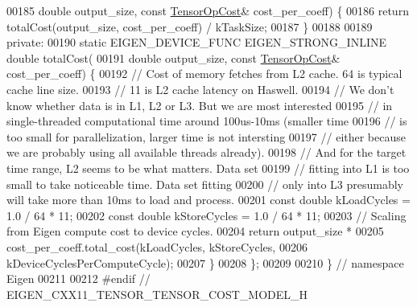 \begin{DoxyCode}
00185       \textcolor{keywordtype}{double} output\_size, \textcolor{keyword}{const} \hyperlink{class_eigen_1_1_tensor_op_cost}{TensorOpCost}& cost\_per\_coeff) \{
00186     \textcolor{keywordflow}{return} totalCost(output\_size, cost\_per\_coeff) / kTaskSize;
00187   \}
00188 
00189  \textcolor{keyword}{private}:
00190   \textcolor{keyword}{static} EIGEN\_DEVICE\_FUNC EIGEN\_STRONG\_INLINE \textcolor{keywordtype}{double} totalCost(
00191       \textcolor{keywordtype}{double} output\_size, \textcolor{keyword}{const} \hyperlink{class_eigen_1_1_tensor_op_cost}{TensorOpCost}& cost\_per\_coeff) \{
00192     \textcolor{comment}{// Cost of memory fetches from L2 cache. 64 is typical cache line size.}
00193     \textcolor{comment}{// 11 is L2 cache latency on Haswell.}
00194     \textcolor{comment}{// We don't know whether data is in L1, L2 or L3. But we are most interested}
00195     \textcolor{comment}{// in single-threaded computational time around 100us-10ms (smaller time}
00196     \textcolor{comment}{// is too small for parallelization, larger time is not intersting}
00197     \textcolor{comment}{// either because we are probably using all available threads already).}
00198     \textcolor{comment}{// And for the target time range, L2 seems to be what matters. Data set}
00199     \textcolor{comment}{// fitting into L1 is too small to take noticeable time. Data set fitting}
00200     \textcolor{comment}{// only into L3 presumably will take more than 10ms to load and process.}
00201     \textcolor{keyword}{const} \textcolor{keywordtype}{double} kLoadCycles = 1.0 / 64 * 11;
00202     \textcolor{keyword}{const} \textcolor{keywordtype}{double} kStoreCycles = 1.0 / 64 * 11;
00203     \textcolor{comment}{// Scaling from Eigen compute cost to device cycles.}
00204     \textcolor{keywordflow}{return} output\_size *
00205         cost\_per\_coeff.total\_cost(kLoadCycles, kStoreCycles,
00206                                   kDeviceCyclesPerComputeCycle);
00207   \}
00208 \};
00209 
00210 \}  \textcolor{comment}{// namespace Eigen}
00211 
00212 \textcolor{preprocessor}{#endif  // EIGEN\_CXX11\_TENSOR\_TENSOR\_COST\_MODEL\_H}
\end{DoxyCode}
